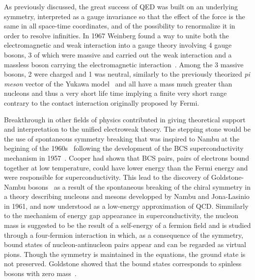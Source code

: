 	As previously discussed, the great success of QED was built on an underlying symmetry, interpreted as a gauge invariance so that the effect of the force is the same in all space-time coordinates, and of the possibility to renormalize it in order to resolve infinities. In 1967 Weinberg found a way to unite both the electromagnetic and weak interaction into a gauge theory involving 4 gauge bosons, 3 of which were massive and carried out the weak interaction and a massless boson carrying the electromagnetic interaction~\cite{WEINBERG1967}. Among the 3 massive bosons, 2 were charged and 1 was neutral, similarly to the previously theorized \textit{pi meson} vector of the Yukawa model~\cite{YUKAWA1935} and all have a mass much greater than nucleons and thus a very short life time implying a finite very short range contrary to the contact interaction originally proposed by Fermi.
	
	Breakthrough in other fields of physics contributed in giving theoretical support and interpretation to the unified electroweak theory. The stepping stone would be the use of spontaneous symmetry breaking that was inspired to Nambu at the begining of the 1960s~\cite{NAMBU1961I,NAMBU1961II} following the development of the \acf{BCS} superconductivity mechanism in 1957~\cite{BCS1957}. Cooper had shown that BCS pairs, pairs of electrons bound together at low temperature, could have lower energy than the Fermi energy and were responsible for superconductivity. This lead to the discovery of Goldstone-Nambu bosons~\cite{NAMBU1960,GOLDSTONE1961} as a result of the spontaneous breaking of the chiral symmetry in a theory describing nucleons and mesons developped by Nambu and Jona-Lasinio in 1961, and now understood as a low-energy approximation of QCD. Simmilarly to the mechanism of energy gap appearance in superconductivity, the nucleon mass is suggested to be the result of a self-energy of a fermion field and is studied through a four-fermion interaction in which, as a consequence of the symmetry, bound states of nucleon-antinucleon pairs appear and can be regarded as virtual pions. Though the symmetry is maintained in the equations, the ground state is not preserved. Goldstone showed that the bound states corresponds to spinless bosons with zero mass~\cite{GOLDSTONE1961}.
	
